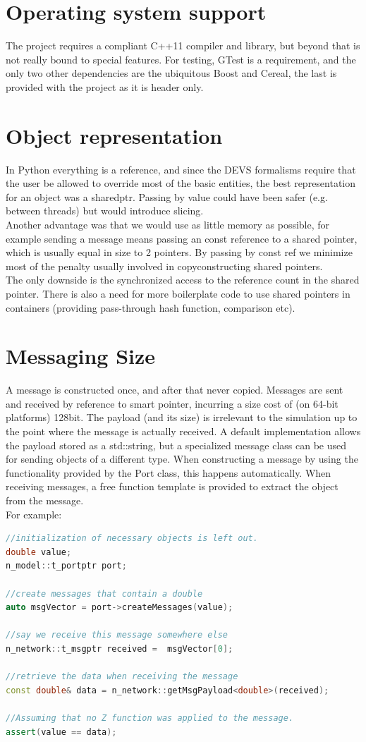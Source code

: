 \documentclass[8pt,a4paper]{report}
\begin{document}
\section{Operating system support}
The project requires a compliant C++11 compiler and library, but beyond that is not really bound to special features. For testing, GTest is a requirement, and the only two other dependencies are the ubiquitous Boost and Cereal, the last is provided with the project as it is header only.

\section{Object representation}
In Python everything is a reference, and since the DEVS formalisms require that the user be allowed to override most of the basic entities, the best representation for an object was a shared\textunderscore ptr. Passing by value could have been safer (e.g. between threads) but would introduce slicing.\\ Another advantage was that we would use as little memory as possible, for example sending a message means passing an const reference to a shared pointer, which is usually equal in size to 2 pointers. By passing by const ref we minimize most of the penalty usually involved in copyconstructing shared pointers. \\
The only downside is the synchronized access to the reference count in the shared pointer. There is also a need for more boilerplate code to use shared pointers in containers (providing pass-through hash function, comparison etc). 

\section{Messaging Size}
A message is constructed once, and after that never copied. Messages are sent and received by reference to smart pointer, incurring a size cost of (on 64-bit platforms) 128bit. The payload (and its size) is irrelevant to the simulation up to the point where the message is actually received. A default implementation allows the payload stored as a std::string, but a specialized message class can be used for sending objects of a different type. When constructing a message by using the functionality provided by the Port class, this happens automatically. When receiving messages, a free function template is provided to extract the object from the message.\\
For example:
\begin{lstlisting}[language=C++,basicstyle=\small\color{black}]
//initialization of necessary objects is left out.
double value;
n_model::t_portptr port;

//create messages that contain a double
auto msgVector = port->createMessages(value);

//say we receive this message somewhere else
n_network::t_msgptr received =  msgVector[0];

//retrieve the data when receiving the message
const double& data = n_network::getMsgPayload<double>(received);

//Assuming that no Z function was applied to the message.
assert(value == data);
\end{lstlisting}
\end{document}
